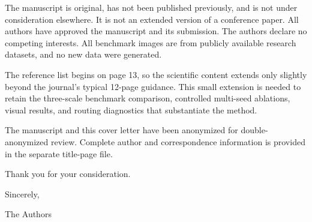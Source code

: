 \documentclass[10pt]{article}
\begin{document}
The manuscript is original, has not been published previously, and is not under
consideration elsewhere. It is not an extended version of a conference paper.
All authors have approved the manuscript and its submission. The authors declare
no competing interests. All benchmark images are from publicly available
research datasets, and no new data were generated.

The reference list begins on page 13, so the scientific content extends only
slightly beyond the journal's typical 12-page guidance. This small extension is
needed to retain the three-scale benchmark comparison, controlled multi-seed
ablations, visual results, and routing diagnostics that substantiate the method.

The manuscript and this cover letter have been anonymized for double-anonymized
review. Complete author and correspondence information is provided in the
separate title-page file.

Thank you for your consideration.

Sincerely,

The Authors
\end{document}
